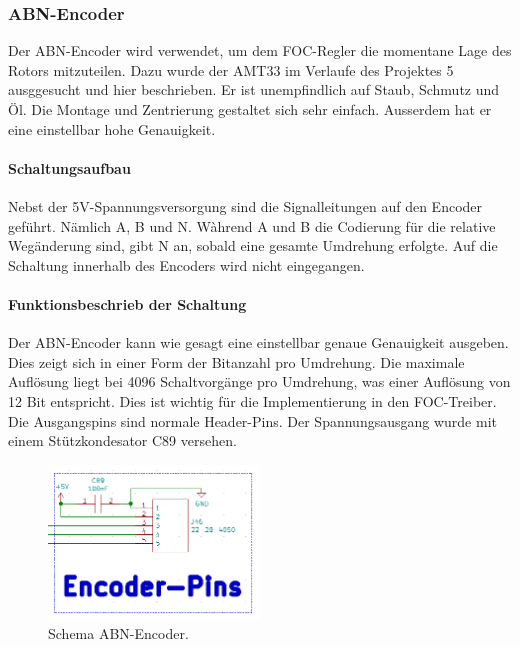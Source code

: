 \subsubsection{ABN-Encoder}
\label{subsubsec:ABN-Encoder}

Der ABN-Encoder wird verwendet, um dem FOC-Regler die momentane Lage des Rotors mitzuteilen. Dazu wurde der AMT33 im Verlaufe des Projektes 5 ausggesucht und hier beschrieben. Er ist unempfindlich auf Staub, Schmutz und Öl. Die Montage und Zentrierung gestaltet sich sehr einfach. Ausserdem hat er eine einstellbar hohe Genauigkeit.

\paragraph{Schaltungsaufbau}\mbox{}

Nebst der 5V-Spannungsversorgung sind die Signalleitungen auf den Encoder geführt. Nämlich A, B und N. Wàhrend A und B die Codierung für die relative Wegänderung sind, gibt N an, sobald eine gesamte Umdrehung erfolgte. Auf die Schaltung innerhalb des Encoders wird nicht eingegangen.

\paragraph{Funktionsbeschrieb der Schaltung}\mbox{}

Der ABN-Encoder kann wie gesagt eine einstellbar genaue Genauigkeit ausgeben. Dies zeigt sich in einer Form der Bitanzahl pro Umdrehung. Die maximale Auflösung liegt bei 4096 Schaltvorgänge pro Umdrehung, was einer Auflösung von 12 Bit entspricht. Dies ist wichtig für die Implementierung in den FOC-Treiber. Die Ausgangspins sind normale Header-Pins. Der Spannungsausgang wurde mit einem Stützkondesator C89 versehen.

\begin{figure}[h!]
	\centering
	\includegraphics[width=0.5\textwidth]{graphics/Schema_ABN_Encoder}
	\caption{Schema ABN-Encoder.}
	\label{fig:Schema_ABN_Encoder}
\end{figure} 